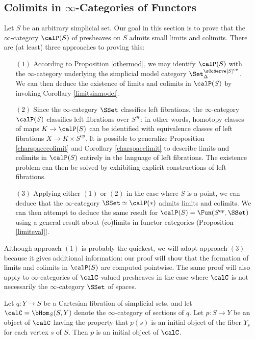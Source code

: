 \subsection{Colimits in $\infty$-Categories of Functors}\label{presheaf2}

Let $S$ be an arbitrary simplicial set. Our goal in this section is to prove that the $\infty$-category $\calP(S)$ of presheaves on $S$ admits small limits and colimits. There are (at least) three approaches to proving this:

\begin{itemize}
\item[$(1)$] According to Proposition \ref{othermod}, we may identify $\calP(S)$ with the
$\infty$-category underlying the simplicial model category $\Set_{\Delta}^{\sCoNerve[S]^{op}}$. We can then deduce the existence of limits and colimits in $\calP(S)$ by invoking Corollary \ref{limitsinmodel}.

\item[$(2)$] Since the $\infty$-category $\SSet$ classifies left fibrations, the $\infty$-category
$\calP(S)$ classifies left fibrations over $S^{op}$: in other words, homotopy classes of maps
$K \rightarrow \calP(S)$ can be identified with equivalence classes of left fibrations
$X \rightarrow K \times S^{op}$. It is possible to generalize Proposition \ref{charspacecolimit} and
Corollary \ref{charspacelimit} to describe limits and colimits in $\calP(S)$ entirely in the language of left fibrations. The existence problem can then be solved by exhibiting explicit constructions of left fibrations.

\item[$(3)$] Applying either $(1)$ or $(2)$ in the case where $S$ is a point, we can deduce that
the $\infty$-category $\SSet \simeq \calP( \ast)$ admits limits and colimits. We can then attempt to deduce the same result for $\calP(S) = \Fun( S^{op}, \SSet)$ using a general result about (co)limits in functor categories (Proposition \ref{limiteval}). 
\end{itemize}

Although approach $(1)$ is probably the quickest, we will adopt approach $(3)$ because it gives additional information: our proof will show that the formation of limits and colimits in $\calP(S)$ are computed pointwise. The same proof will also apply to $\infty$-categories of $\calC$-valued presheaves in the case where $\calC$ is not necessarily the $\infty$-category $\SSet$ of spaces.

\begin{lemma}\label{topaz2}
Let $q: Y \rightarrow S$ be a Cartesian fibration of simplicial sets, and let
$\calC = \bHom_{S}(S,Y)$ denote the $\infty$-category of sections of $q$. Let
$p: S \rightarrow Y$ be an object of $\calC$ having the property that $p(s)$ is an initial object of the 
fiber $Y_{s}$ for each vertex $s$ of $S$. Then $p$ is an initial object of $\calC$.
\end{lemma}

